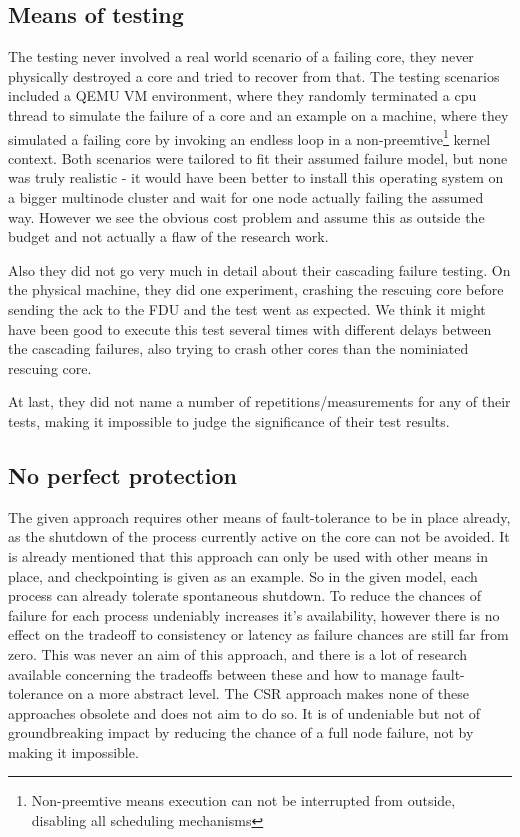 \documentclass[a4paper,10pt,twoside]{article}
\begin{document}
\subsection{Means of testing}
The testing never involved a real world scenario of a failing core, they never physically destroyed a core and tried to recover from that. The testing scenarios included a QEMU VM environment, where they randomly terminated a cpu thread to simulate the failure of a core and an example on a machine, where they simulated a failing core by invoking an endless loop in a non-preemtive\footnote{Non-preemtive means execution can not be interrupted from outside, disabling all scheduling mechanisms} kernel context. Both scenarios were tailored to fit their assumed failure model, but none was truly realistic - it would have been better to install this operating system on a bigger multinode cluster and wait for one node actually failing the assumed way. However we see the obvious cost problem and assume this as outside the budget and not actually a flaw of the research work.

Also they did not go very much in detail about their cascading failure testing. On the physical machine, they did one experiment, crashing the rescuing core before sending the ack to the FDU and the test went as expected. We think it might have been good to execute this test several times with different delays between the cascading failures, also trying to crash other cores than the nominiated rescuing core.

At last, they did not name a number of repetitions/measurements for any of their tests, making it impossible to judge the significance of their test results.

\subsection{No perfect protection}

The given approach requires other means of fault-tolerance to be in place already, as the shutdown of the process currently active on the core can not be avoided. It is already mentioned that this approach can only be used with other means in place, and checkpointing is given as an example. So in the given model, each process can already tolerate spontaneous shutdown. To reduce the chances of failure for each process undeniably increases it's availability, however there is no effect on the tradeoff to consistency or latency as failure chances are still far from zero. This was never an aim of this approach, and there is a lot of research available concerning the tradeoffs between these and how to manage fault-tolerance on a more abstract level. The CSR approach makes none of these approaches obsolete and does not aim to do so. It is of undeniable but not of groundbreaking impact by reducing the chance of a full node failure, not by making it impossible.
\end{document}
